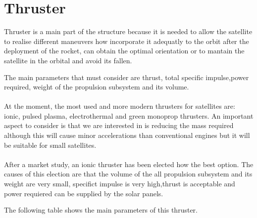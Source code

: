 \section{Thruster}
 
Thruster is a main part of the structure because it is needed to allow the satellite to realise different maneuvers how incorporate it adequatly to the orbit after the deployment of the rocket, can obtain the optimal orientation or to mantain the satellite in the orbital and avoid its fallen. 

The main parameters that must consider are thrust, total specific impulse,power required, weight of the  propulsion subsystem and its volume.

\paragraph{}
At the moment, the most used and more modern thrusters for satellites are: ionic, pulsed plasma, electrothermal and green monoprop thrusters. An important aspect to consider is that we are interested in is reducing the mass required although this will cause minor accelerations than conventional engines but it will be suitable for small satellites.

\paragraph{}
After a market study, an ionic thruster has been elected how the best option. The causes of this election are that the volume of the all propulsion subsystem and its weight are very small, specifict impulse is very high,thrust is acceptable and power requiered can be supplied by the solar panels.

The following table shows the main parameters of this thruster.

